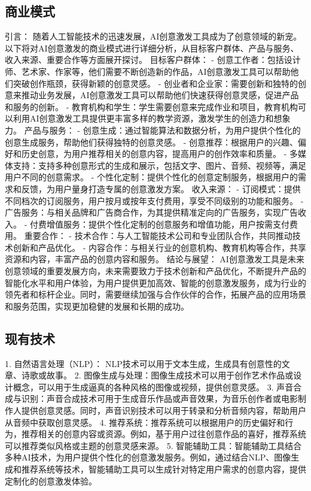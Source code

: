 \subsection{商业模式}
引言：
随着人工智能技术的迅速发展，AI创意激发工具成为了创意领域的新宠。以下将对AI创意激发的商业模式进行详细分析，从目标客户群体、产品与服务、收入来源、重要合作等方面展开探讨。
目标客户群体：
- 创意工作者：包括设计师、艺术家、作家等，他们需要不断创造新的作品，AI创意激发工具可以帮助他们突破创作瓶颈，获得新颖的创意灵感。
- 创业者和企业家：需要创新和独特的创意来推动业务发展，AI创意激发工具可以帮助他们快速获得创意灵感，促进产品和服务的创新。
- 教育机构和学生：学生需要创意来完成作业和项目，教育机构可以利用AI创意激发工具提供更丰富多样的教学资源，激发学生的创造力和想象力。
产品与服务：
- 创意生成：通过智能算法和数据分析，为用户提供个性化的创意生成服务，帮助他们获得独特的创意灵感。
- 创意推荐：根据用户的兴趣、偏好和历史创意，为用户推荐相关的创意内容，提高用户的创作效率和质量。
- 多媒体支持：支持多种创意形式的生成和展示，包括文字、图片、音频、视频等，满足用户不同的创意需求。
- 个性化定制：提供个性化的创意定制服务，根据用户的需求和反馈，为用户量身打造专属的创意激发方案。
收入来源：
- 订阅模式：提供不同档次的订阅服务，用户按月或按年支付费用，享受不同级别的功能和服务。
- 广告服务：与相关品牌和广告商合作，为其提供精准定向的广告服务，实现广告收入。
- 付费增值服务：提供个性化定制的创意服务和增值功能，用户按需支付费用。
重要合作：
- 技术合作：与人工智能技术公司和专业团队合作，共同推动技术创新和产品优化。
- 内容合作：与相关行业的创意机构、教育机构等合作，共享资源和内容，丰富产品的创意内容和服务。
结论与展望：
AI创意激发工具是未来创意领域的重要发展方向，未来需要致力于技术创新和产品优化，不断提升产品的智能化水平和用户体验，为用户提供更加高效、智能的创意激发服务，成为行业的领先者和标杆企业。同时，需要继续加强与合作伙伴的合作，拓展产品的应用场景和服务范围，实现更加稳健的发展和长期的成功。

\subsection{现有技术}
1. 自然语言处理（NLP）： NLP技术可以用于文本生成，生成具有创意性的文章、诗歌或故事。
2. 图像生成与处理：图像生成技术可以用于创作艺术作品或设计概念，可以用于生成逼真的各种风格的图像或视频，提供创意灵感。
3. 声音合成与识别：声音合成技术可用于生成音乐作品或声音效果，为音乐创作者或电影制作人提供创意灵感。同时，声音识别技术可以用于转录和分析音频内容，帮助用户从音频中获取创意灵感。
4. 推荐系统：推荐系统可以根据用户的历史偏好和行为，推荐相关的创意内容或资源。例如，基于用户过往创意作品的喜好，推荐系统可以推荐类似风格或主题的创意灵感来源。
5. 智能辅助工具：智能辅助工具结合多种AI技术，为用户提供个性化的创意激发服务。例如，通过结合NLP、图像生成和推荐系统等技术，智能辅助工具可以生成针对特定用户需求的创意内容，提供定制化的创意激发体验。

